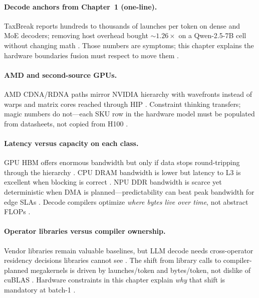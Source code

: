 \paragraph{Decode anchors from Chapter~1 (one-line).}
TaxBreak reports hundreds to thousands of launches per token on dense and MoE decoders; removing host overhead bought ${\sim}1.26\times$ on a Qwen-2.5-7B cell without changing math \citep{taxbreak2026,memoryfloor2026,nvidia2024cudagraphs}.
Those numbers are symptoms; this chapter explains the hardware boundaries fusion must respect to move them \citep{patel2025llminference}.

\paragraph{AMD and second-source GPUs.}
AMD CDNA/RDNA paths mirror NVIDIA hierarchy with wavefronts instead of warps and matrix cores reached through HIP \citep{amd2024aie}.
Constraint thinking transfers; magic numbers do not---each SKU row in the hardware model must be populated from datasheets, not copied from H100 \citep{yirage2026,patel2025llminference}.

\paragraph{Latency versus capacity on each class.}
GPU HBM offers enormous bandwidth but only if data stops round-tripping through the hierarchy \citep{nvidia2022hopper,memoryfloor2026}.
CPU DRAM bandwidth is lower but latency to L3 is excellent when blocking is correct \citep{dlbook,patel2025llminference}.
NPU DDR bandwidth is scarce yet deterministic when DMA is planned---predictability can beat peak bandwidth for edge SLAs \citep{amd2024xdna,amd2024aie}.
Decode compilers optimize \emph{where bytes live over time}, not abstract FLOPs \citep{taxbreak2026,kwon2023vllm}.

\paragraph{Operator libraries versus compiler ownership.}
Vendor libraries remain valuable baselines, but LLM decode needs cross-operator residency decisions libraries cannot see \citep{chen2018tvm,taxbreak2026}.
The shift from library calls to compiler-planned megakernels is driven by launches/token and bytes/token, not dislike of cuBLAS \citep{memoryfloor2026,yirage2026}.
Hardware constraints in this chapter explain \emph{why} that shift is mandatory at batch-1 \citep{patel2025llminference}.

